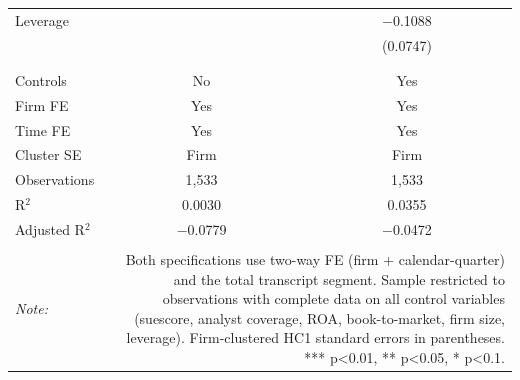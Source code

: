 \begin{table}[!htbp]
\begin{tabular}{@{\extracolsep{5pt}}lcc}
 Leverage &  & $-$0.1088 \\ 
  &  & (0.0747) \\ 
  & & \\ 
\hline \\[-1.8ex] 
Controls & No & Yes \\ 
Firm FE & Yes & Yes \\ 
Time FE & Yes & Yes \\ 
Cluster SE & Firm & Firm \\ 
Observations & 1,533 & 1,533 \\ 
R$^{2}$ & 0.0030 & 0.0355 \\ 
Adjusted R$^{2}$ & $-$0.0779 & $-$0.0472 \\ 
\hline 
\hline \\[-1.8ex] 
\textit{Note:}  & \multicolumn{2}{r}{Both specifications use two-way FE (firm + calendar-quarter) and the total transcript segment. Sample restricted to observations with complete data on all control variables (suescore, analyst coverage, ROA, book-to-market, firm size, leverage). Firm-clustered HC1 standard errors in parentheses. *** p<0.01, ** p<0.05, * p<0.1.} \\ 
\end{tabular} 
\end{table} 
